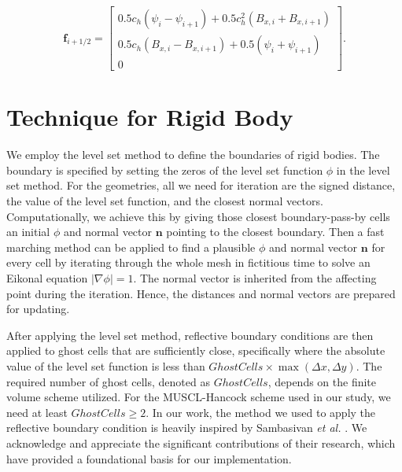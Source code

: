 \begin{equation*}
\mathbf{f}_{i+1/2}=\begin{bmatrix}
0.5c_h(\psi_i-\psi_{i+1})+0.5c_h^2(B_{x,i}+B_{x,i+1}) \\
0.5c_h(B_{x,i}-B_{x,i+1})+0.5(\psi_i+\psi_{i+1})\\
0
\end{bmatrix}.
\end{equation*}

\section{Technique for Rigid Body}
We employ the level set method \cite{andrew2000level} to define the boundaries of rigid bodies. The boundary is specified by setting the zeros of the level set function $\phi$ in the level set method. For the geometries, all we need for iteration are the signed distance, the value of the level set function, and the closest normal vectors. Computationally, we achieve this by giving those closest boundary-pass-by cells an initial $\phi$ and normal vector $\mathbf{n}$ pointing to the closest boundary. Then a fast marching method can be applied to find a plausible $\phi$ and normal vector $\mathbf{n}$ for every cell by iterating through the whole mesh in fictitious time to solve an Eikonal equation $|\nabla\phi|=1$. The normal vector is inherited from the affecting point during the iteration. Hence, the distances and normal vectors are prepared for updating.

After applying the level set method, reflective boundary conditions are then applied to ghost cells that are sufficiently close, specifically where the absolute value of the level set function is less than $GhostCells \times \max(\Delta x, \Delta y)$. The required number of ghost cells, denoted as $GhostCells$, depends on the finite volume scheme utilized. For the MUSCL-Hancock scheme used in our study, we need at least $GhostCells \ge 2$. In our work, the method we used to apply the reflective boundary condition is heavily inspired by Sambasivan \textit{et al.} \cite{sambasivan2009ghost}. We acknowledge and appreciate the significant contributions of their research, which have provided a foundational basis for our implementation.
